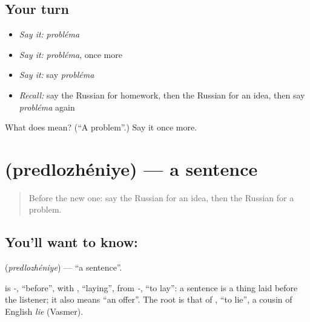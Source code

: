 \subsection*{Your turn}
\begin{itemize}
\raggedright
  \item \emph{Say it:} \emph{probléma}
  \item \emph{Say it:} \emph{probléma}, once more
  \item \emph{Say it:} say \emph{probléma}
  \item \emph{Recall:} say the Russian for homework, then the Russian for an idea, then say \emph{probléma} again
\end{itemize}

\begin{tcolorbox}[breakable,colback=teal!4,colframe=teal!35!black,title={Before you move on}]
What does  mean? (\textquotedblleft{}A problem\textquotedblright{}.) Say it once more.
\end{tcolorbox}
\section[\texorpdfstring{\ru{предложение} (predlozhéniye)}{предложение (predlozhéniye)}]{ (predlozhéniye) — a sentence}

\label{lesson:RU-C112-sentence}



\begin{quote}
Before the new one: say the Russian for an idea, then the Russian for a problem.
\end{quote}

\subsection*{You'll want to know: }
\textbf{} (\emph{predlozhéniye}) — \textquotedblleft{}a sentence\textquotedblright{}.

\begin{cousinweb}
\textbf{} is \emph{-}, \textquotedblleft{}before\textquotedblright{}, with \emph{}, \textquotedblleft{}laying\textquotedblright{}, from \emph{-}, \textquotedblleft{}to lay\textquotedblright{}: a sentence is a thing laid before the listener; it also means \textquotedblleft{}an offer\textquotedblright{}. The root is that of \emph{}, \textquotedblleft{}to lie\textquotedblright{}, a cousin of English \emph{lie} (Vasmer).
\end{cousinweb}

